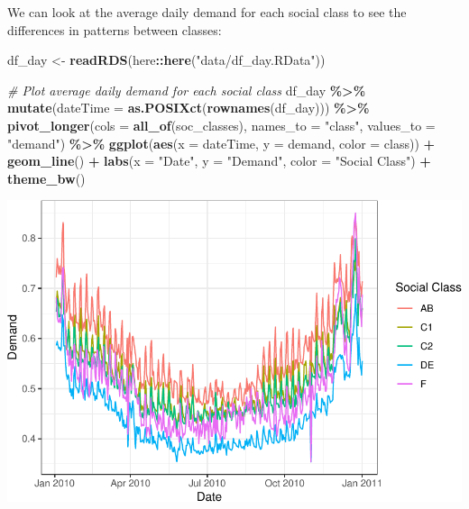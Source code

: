 \documentclass[
]{article}
\newenvironment{Shaded}{\begin{snugshade}}{\end{snugshade}}
\newcommand{\AttributeTok}[1]{\textcolor[rgb]{0.13,0.29,0.53}{#1}}
\newcommand{\CommentTok}[1]{\textcolor[rgb]{0.56,0.35,0.01}{\textit{#1}}}
\newcommand{\FunctionTok}[1]{\textcolor[rgb]{0.13,0.29,0.53}{\textbf{#1}}}
\newcommand{\NormalTok}[1]{#1}
\newcommand{\OtherTok}[1]{\textcolor[rgb]{0.56,0.35,0.01}{#1}}
\newcommand{\SpecialCharTok}[1]{\textcolor[rgb]{0.81,0.36,0.00}{\textbf{#1}}}
\newcommand{\StringTok}[1]{\textcolor[rgb]{0.31,0.60,0.02}{#1}}
\begin{document}
We can look at the average daily demand for each social class to see the
differences in patterns between classes:

\begin{Shaded}
\begin{Highlighting}[]
\NormalTok{df\_day }\OtherTok{\textless{}{-}} \FunctionTok{readRDS}\NormalTok{(here}\SpecialCharTok{::}\FunctionTok{here}\NormalTok{(}\StringTok{"data/df\_day.RData"}\NormalTok{))}

\CommentTok{\# Plot average daily demand for each social class}
\NormalTok{df\_day }\SpecialCharTok{\%\textgreater{}\%}
  \FunctionTok{mutate}\NormalTok{(}\AttributeTok{dateTime =} \FunctionTok{as.POSIXct}\NormalTok{(}\FunctionTok{rownames}\NormalTok{(df\_day))) }\SpecialCharTok{\%\textgreater{}\%} 
  \FunctionTok{pivot\_longer}\NormalTok{(}\AttributeTok{cols =} \FunctionTok{all\_of}\NormalTok{(soc\_classes), }\AttributeTok{names\_to =} \StringTok{"class"}\NormalTok{, }\AttributeTok{values\_to =} \StringTok{"demand"}\NormalTok{) }\SpecialCharTok{\%\textgreater{}\%}
  \FunctionTok{ggplot}\NormalTok{(}\FunctionTok{aes}\NormalTok{(}\AttributeTok{x =}\NormalTok{ dateTime, }\AttributeTok{y =}\NormalTok{ demand, }\AttributeTok{color =}\NormalTok{ class)) }\SpecialCharTok{+}
  \FunctionTok{geom\_line}\NormalTok{() }\SpecialCharTok{+}
  \FunctionTok{labs}\NormalTok{(}\AttributeTok{x =} \StringTok{"Date"}\NormalTok{, }\AttributeTok{y =} \StringTok{"Demand"}\NormalTok{, }\AttributeTok{color =} \StringTok{"Social Class"}\NormalTok{) }\SpecialCharTok{+}
  \FunctionTok{theme\_bw}\NormalTok{()}
\end{Highlighting}
\end{Shaded}

\includegraphics{main_files/figure-latex/unnamed-chunk-3-1.pdf}
\end{document}
